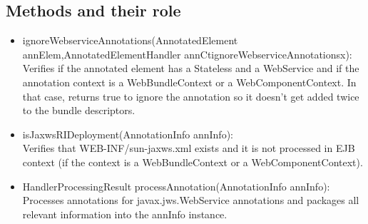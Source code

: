 

	\subsection{Methods and their role}
		\begin{itemize}
			\item ignoreWebserviceAnnotations(AnnotatedElement annElem,AnnotatedElementHandler annCtignoreWebserviceAnnotationsx): \\ \hfill
			Verifies if the annotated element has a Stateless and a WebService and if the annotation
			context is a WebBundleContext or a WebComponentContext. In that case, returns true to ignore the annotation so it doesn't get added twice to the bundle descriptors.
			\item isJaxwsRIDeployment(AnnotationInfo annInfo): \\ \hfill
			Verifies that WEB-INF/sun-jaxws.xml exists and it is not processed in EJB context (if the context is a WebBundleContext or a WebComponentContext). 
			\item HandlerProcessingResult processAnnotation(AnnotationInfo annInfo): \\ \hfill
			Processes annotations for javax.jws.WebService annotations and packages all relevant information into the annInfo instance. 
			\end{itemize}
